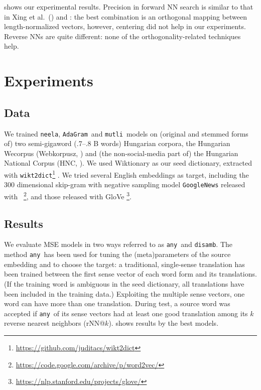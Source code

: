 \documentclass[11pt]{article}
\newcommand{\neelakantan}{\texttt{neela}}
\newcommand{\adagram}{\texttt{AdaGram}}
\newcommand{\mutli}{\texttt{mutli}}
\newcommand{\any}{\texttt{any}}
\newcommand{\disamb}{\texttt{disamb}}
\newcommand{\todo}[1]{}
\begin{document}
 shows our experimental results. Precision in forward NN
search is similar to that in Xing et al.~(\citeyear{Xing:2015}) and
\cite{Artetxe:2016}: the best combination is an orthogonal mapping between
length-normalized vectors, however, centering did not help in our experiments.
Reverse NNs are quite different: none of the orthogonality-related techniques
help.

\section{Experiments}
\label{sec:exper}

\subsection{Data}

We trained \neelakantan, \adagram~and \mutli~models on (original and stemmed
forms of) two semi-gigaword (.7--.8 B words) Hungarian corpora, the Hungarian
Wecorpus (Webkorpusz, \cite{Halacsy:2004}) and (the non-social-media part of)
the Hungarian National Corpus (HNC, \cite{Oravecz:2014}).  We used Wiktionary
as our seed dictionary, extracted with
\texttt{wikt2dict}\footnote{\url{https://github.com/juditacs/wikt2dict}}
\citep{Acs:2013}. We tried several English embeddings as target, including the
300 dimensional skip-gram with negative sampling model \texttt{GoogleNews}
released with
\wordtovec~\citep{Mikolov:2013f}\footnote{\url{https://code.google.com/archive/p/word2vec/}},
and those released with GloVe
\citep{Pennington:2014}\footnote{\url{https://nlp.stanford.edu/projects/glove/}}.

\subsection{Results}

\label{sec:res}


We evaluate MSE models in two ways referred to as \any~and \disamb.  The method
\any~has been used for tuning the (meta)parameters of the source embedding and
to choose the target: a traditional, single-sense translation has been trained
between the first \todo{all} sense vector of each word form and its
translations. (If the training word is ambiguous in the seed dictionary, all
translations have been included in the training data.)  Exploiting the multiple
sense vectors, one word can have more than one translation.  During test, a
source word was accepted if \any~\todo{the 1st}of its sense vectors had at
least one good translation among its $k$ reverse nearest neighbors (rNN@$k$).
 shows results by the best models.
\end{document}
